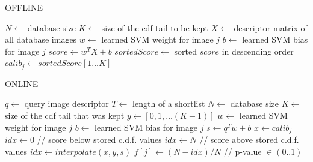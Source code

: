       \begin{algorithm}
         \caption{OFFLINE}\label{alg:offline}
         \begin{algorithmic}[1]
         \State $N \gets$ database size
         \State $K \gets$ size of the cdf tail to be kept
         \State $X \gets$ descriptor matrix of all database images
            \State $w \gets$ learned SVM weight for image $j$
            \State $b \gets$ learned SVM bias for image $j$
            \State $score \gets w^TX+b$
            \State $sortedScore \gets$ sorted $score$ in descending order
            \State $calib_j \gets sortedScore[1\dots K]$
         \EndFor
         \EndProcedure
         \end{algorithmic}
         \label{alg:onffline}
      \end{algorithm}

       \begin{algorithm}
         \caption{ONLINE}\label{alg:online}
         \begin{algorithmic}[1]
         \State $q \gets$ query image descriptor
         \State $T \gets$ length of a shortlist
         \State $N \gets$ database size
         \State $K \gets$ size of the cdf tail that was kept
         \State $y \gets [0,1,\dots (K-1)]$
            \State $w \gets$ learned SVM weight for image $j$
            \State $b \gets$ learned SVM bias for image $j$
            \State $s \gets q^Tw+b$
            \State $x \gets calib_j$
               \State $idx \gets 0$ \hspace{10mm} // score below stored c.d.f. values
               \State $idx \gets N$ \hspace{9mm} // score above stored c.d.f. values 
            \Else
               \State $idx \gets interpolate(x,y,s)$
            \EndIf
            \State $f[j] \gets (N-idx)/N$ \hspace{10mm} // p-value $\in (0..1)$
         \EndFor
         \EndProcedure
         \end{algorithmic}
         \label{alg:online}
      \end{algorithm}


